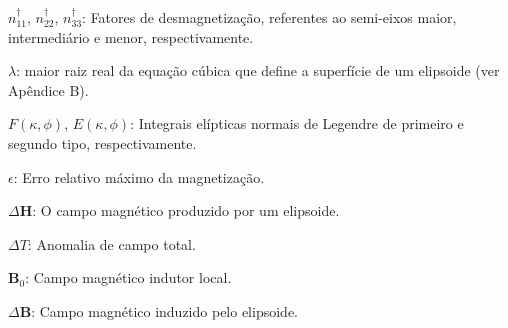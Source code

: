 $n^{\dagger}_{11}$, $n^{\dagger}_{22}$, $n^{\dagger}_{33}$: Fatores de desmagnetização, referentes ao semi-eixos maior, intermediário e menor, respectivamente.

$\lambda$: maior raiz real da equação cúbica que define a superfície de um elipsoide (ver Apêndice B).

$F(\kappa, \phi)$, $E(\kappa, \phi)$: Integrais elípticas normais de Legendre de primeiro e segundo tipo, respectivamente.

$\epsilon$: Erro relativo máximo da magnetização.

$\Delta {\mathbf{H}}$: O campo magnético produzido por um elipsoide.

$\Delta {T}$: Anomalia de campo total.

${\mathbf{B}}_{0}$: Campo  magnético indutor local.

$\Delta \mathbf{B}$: Campo magnético induzido pelo elipsoide.